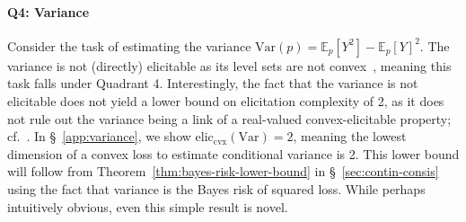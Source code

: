\documentclass{article} %
\newcommand{\eliccvx}{\mathrm{elic}_\mathrm{cvx}}
\newcommand{\E}{\mathbb{E}}
\newcommand{\Var}{\mathrm{Var}}
\begin{document}
\paragraph{Q4: Variance}
Consider the task of estimating the variance $\Var(p) = \E_p[Y^2] - \E_p[Y]^2$.
The variance is not (directly) elicitable as its level sets are not convex~\cite{osband1985providing,lambert2008eliciting}, meaning this task falls under Quadrant 4.
Interestingly, the fact that the variance is not elicitable does not yield a lower bound on elicitation complexity of 2, as it does not rule out the variance being a link of a real-valued convex-elicitable property; cf.~\citet[Remark 1]{frongillo2020elicitation}.
In \S~\ref{app:variance}, we show $\eliccvx(\Var)=2$, meaning the lowest dimension of a convex loss to estimate conditional variance is 2. %
This lower bound will follow from Theorem~\ref{thm:bayes-risk-lower-bound} in \S~\ref{sec:contin-consis} using the fact that variance is the Bayes risk of squared loss. %
While perhaps intuitively obvious, even this simple result is novel.
\end{document}
